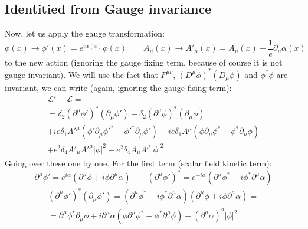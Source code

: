\documentclass{article}
\begin{document}
\subsection{Identitied from Gauge invariance}
Now, let us apply the gauge transformation:
\begin{equation}
    \phi(x) \rightarrow \phi'(x) = e^{i\alpha(x)}\phi(x)
    \qquad
    A_\mu(x) \rightarrow A'_\mu(x) = A_\mu(x) - \frac{1}{e}\partial_\mu \alpha(x)
\end{equation}
 to the new action (ignoring the gauge fixing term, because of course it is not gauge invariant). We will use the fact that $F^{\mu\nu}$, $\left(D^\mu \phi\right)^*\left(D_\mu \phi\right)$ and $\phi^*\phi$ are invariant, we can write (again, ignoring the gauge fising term):
\begin{equation}
\begin{gathered}
    \mathcal{L}' - \mathcal{L} = \\ =
    \delta_2\left(\partial^\mu \phi'\right)^*\left(\partial_\mu \phi'\right) - \delta_2\left(\partial^\mu \phi\right)^*\left(\partial_\mu \phi\right) \\ +
    ie\delta_1 A'^\mu \left(\phi' \partial_\mu \phi'^* - \phi'^* \partial_\mu \phi' \right) - ie\delta_1 A^\mu \left(\phi \partial_\mu \phi^* - \phi^* \partial_\mu \phi \right) \\ +
    e^2 \delta_{4} A'_\mu A'^\mu |\phi|^2 - e^2 \delta_{4} A_\mu A^\mu |\phi|^2
\end{gathered}
\end{equation}
Going over these one by one. For the first term (scalar field kinetic term):
\begin{equation}
    \partial^\mu \phi' = e^{i\alpha}\left(\partial^\mu\phi + i\phi\partial^\mu\alpha\right)
    \qquad
    \left(\partial^\mu \phi'\right)^* = e^{-i\alpha}\left(\partial^\mu\phi^* - i\phi^*\partial^\mu\alpha\right)
\end{equation}
\begin{equation}
\begin{gathered}
    \left(\partial^\mu \phi'\right)^*\left(\partial_\mu \phi'\right) =
    \left(\partial^\mu\phi^* - i\phi^*\partial^\mu\alpha\right)
    \left(\partial^\mu\phi + i\phi\partial^\mu\alpha\right) = \\ =
    \partial^\mu \phi^* \partial_\mu \phi +
    i \partial^\mu \alpha (\phi \partial^\mu\phi^* - \phi^* \partial^\mu\phi) +
    \left(\partial^\mu \alpha\right)^2 |\phi|^2
\end{gathered}
\end{equation}
\end{document}
